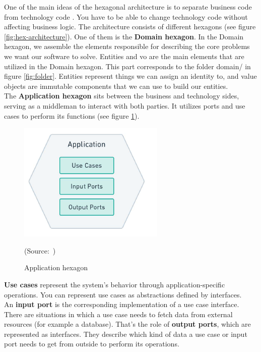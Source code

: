         One of the main ideas of the hexagonal architecture is to separate business code from technology code \autocite[cf.][p.]{hexagonal_architecture}. You have to be able to change technology code without affecting business logic. The architecture consists of different hexagons (see figure \ref{fig:hex-architecture}). One of them is the \textbf{Domain hexagon}. In the Domain hexagon, we assemble the elements responsible for describing the core problems we want our software to solve. Entities and \ac{vo} are the main elements that are utilized in the Domain hexagon. This part corresponds to the folder domain/ in figure \ref{fig:folder}. Entities represent things we can assign an identity to, and value objects are immutable components that we can use to build our entities. \\
        The \textbf{Application hexagon} sits between the business and technology sides, serving as a middleman to interact with both parties. It utilizes ports and use cases to perform its functions (see figure \ref{fig:application-hexagon}). 

        \begin{figure}[h]
            \centering
            \includegraphics{images/application-hexagon.png}
            \caption{Application hexagon}
            \mbox{(Source: \autocite[][p.17]{hexagonal_architecture})}
            \label{fig:application-hexagon}
        \end{figure}

        \textbf{Use cases} represent the system's behavior through application-specific operations. You can represent use cases as abstractions defined by interfaces. \\
        An \textbf{input port} is the corresponding implementation of a use case interface. \\
        There are situations in which a use case needs to fetch data from external resources (for example a database). That's the role of \textbf{output ports}, which are represented as interfaces. They describe  which kind of data a use case or input port needs to get from outside to perform its operations. 

